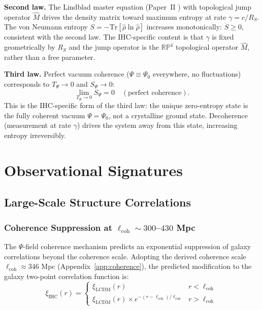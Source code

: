 \textbf{Second law.}
The Lindblad master equation (Paper~II \citep{Peacock2026b_qm}) with topological jump operator
$\hat{M}$ drives the density matrix toward maximum entropy at rate $\gamma = c/R_S$.
The von Neumann entropy $S = -\mathrm{Tr}[\hat{\rho}\ln\hat{\rho}]$
increases monotonically: $\dot{S} \geq 0$, consistent with the second law.
The IHC-specific content is that $\gamma$ is fixed geometrically by $R_S$
and the jump operator is the $\mathbb{RP}^4$ topological operator $\hat{M}$,
rather than a free parameter.


\textbf{Third law.}
Perfect vacuum coherence ($\Psi \equiv \Psi_0$ everywhere, no fluctuations)
corresponds to $T_\Psi \to 0$ and $S_\Psi \to 0$:
\begin{equation}
\lim_{T_\Psi \to 0} S_\Psi = 0 \quad (\text{perfect coherence}).
\end{equation}
This is the IHC-specific form of the third law: the unique zero-entropy state
is the fully coherent vacuum $\Psi = \Psi_0$, not a crystalline ground state.
Decoherence (measurement at rate $\gamma$) drives the system away from this
state, increasing entropy irreversibly.

\section{Observational Signatures}

\subsection{Large-Scale Structure Correlations}

\subsubsection{Coherence Suppression at $\ell_{\text{coh}} \sim 300$--$430$ Mpc}

The $\Psi$-field coherence mechanism predicts an exponential suppression of galaxy correlations beyond the coherence scale. Adopting the derived coherence scale $\ell_{\text{coh}} \approx 346$ Mpc (Appendix~\ref{app:coherence}), the predicted modification to the galaxy two-point correlation function is:
\begin{equation}
\xi_{\text{IHC}}(r) = \begin{cases}
\xi_{\text{LCDM}}(r) & r < \ell_{\text{coh}} \\
\xi_{\text{LCDM}}(r) \times e^{-(r - \ell_{\text{coh}})/\ell_{\text{coh}}} & r > \ell_{\text{coh}}
\end{cases}
\end{equation}

